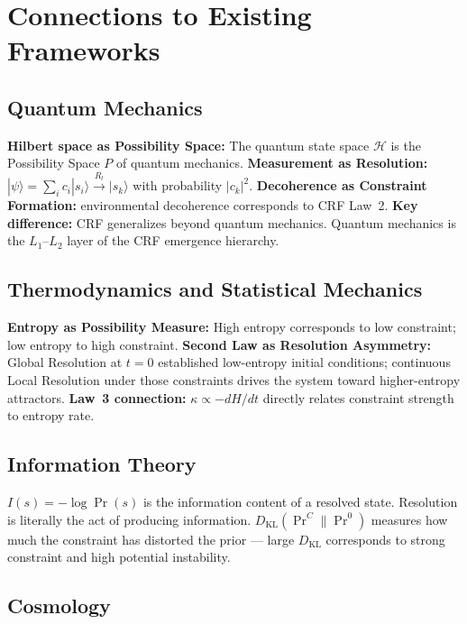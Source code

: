 \documentclass[12pt, a4paper]{article}
\begin{document}
\section{Connections to Existing Frameworks}

\subsection{Quantum Mechanics}

\textbf{Hilbert space as Possibility Space:} The quantum state space $\mathcal{H}$ is the
Possibility Space $P$ of quantum mechanics. \textbf{Measurement as Resolution:}
$|\psi\rangle = \sum_i c_i|s_i\rangle \xrightarrow{R_l} |s_k\rangle$ with probability
$|c_k|^2$. \textbf{Decoherence as Constraint Formation:} environmental decoherence
corresponds to CRF Law~2. \textbf{Key difference:} CRF generalizes beyond quantum
mechanics. Quantum mechanics is the $L_1$--$L_2$ layer of the CRF emergence hierarchy.

\subsection{Thermodynamics and Statistical Mechanics}

\textbf{Entropy as Possibility Measure:} High entropy corresponds to low constraint; low
entropy to high constraint. \textbf{Second Law as Resolution Asymmetry:} Global Resolution
at $t = 0$ established low-entropy initial conditions; continuous Local Resolution under
those constraints drives the system toward higher-entropy attractors. \textbf{Law~3
connection:} $\kappa \propto -dH/dt$ directly relates constraint strength to entropy rate.

\subsection{Information Theory}

$I(s) = -\log\Pr(s)$ is the information content of a resolved state. Resolution is
literally the act of producing information. $D_{\mathrm{KL}}(\Pr^C\|\Pr^0)$ measures how
much the constraint has distorted the prior --- large $D_{\mathrm{KL}}$ corresponds to
strong constraint and high potential instability.

\subsection{Cosmology}
\end{document}
